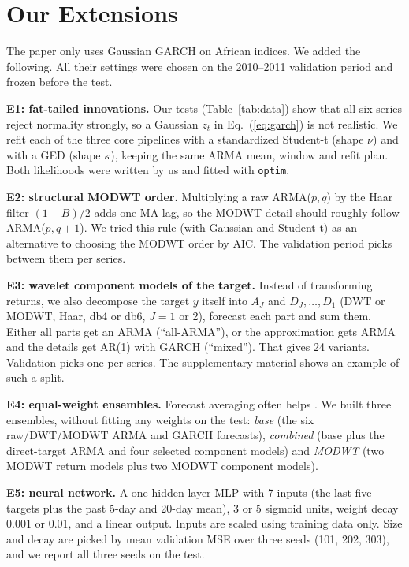 \documentclass{article}
\begin{document}
\section{Our Extensions}
\label{sec:ext}

The paper only uses Gaussian GARCH on African indices. We added the following. All their settings were chosen on the 2010--2011 validation period and frozen before the test.

\textbf{E1: fat-tailed innovations.} Our tests (Table~\ref{tab:data}) show that all six series reject normality strongly, so a Gaussian $z_t$ in Eq.~(\ref{eq:garch}) is not realistic. We refit each of the three core pipelines with a standardized Student-t (shape $\nu$) and with a GED (shape $\kappa$), keeping the same ARMA mean, window and refit plan. Both likelihoods were written by us and fitted with \texttt{optim}.

\textbf{E2: structural MODWT order.} Multiplying a raw ARMA($p,q$) by the Haar filter $(1-B)/2$ adds one MA lag, so the MODWT detail should roughly follow ARMA($p,q+1$). We tried this rule (with Gaussian and Student-t) as an alternative to choosing the MODWT order by AIC. The validation period picks between them per series.

\textbf{E3: wavelet component models of the target.} Instead of transforming returns, we also decompose the target $y$ itself into $A_J$ and $D_J,\dots,D_1$ (DWT or MODWT, Haar, db4 or db6, $J=1$ or 2), forecast each part and sum them. Either all parts get an ARMA (``all-ARMA''), or the approximation gets ARMA and the details get AR(1) with GARCH (``mixed''). That gives 24 variants. Validation picks one per series. The supplementary material shows an example of such a split.

\textbf{E4: equal-weight ensembles.} Forecast averaging often helps \cite{bates1969}. We built three ensembles, without fitting any weights on the test: \emph{base} (the six raw/DWT/MODWT ARMA and GARCH forecasts), \emph{combined} (base plus the direct-target ARMA and four selected component models) and \emph{MODWT} (two MODWT return models plus two MODWT component models).

\textbf{E5: neural network.} A one-hidden-layer MLP \cite{venables2002} with 7 inputs (the last five targets plus the past 5-day and 20-day mean), 3 or 5 sigmoid units, weight decay 0.001 or 0.01, and a linear output. Inputs are scaled using training data only. Size and decay are picked by mean validation MSE over three seeds (101, 202, 303), and we report all three seeds on the test.
\end{document}
